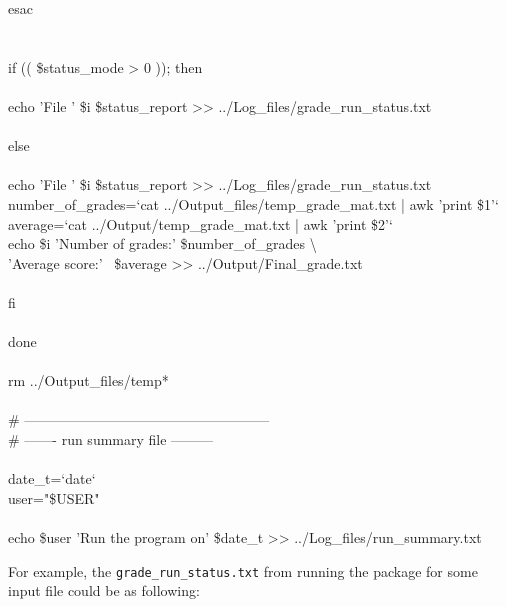 \begin{mdframed}[hidealllines=true,backgroundcolor=gray!20]
\begin{singlespace}
{{\color{for_pink}esac}\\
\\
\\
{\color{for_pink}if} (( \$status\_mode > 0 )); {\color{for_pink}then}\\
\\
echo {\color{red}'File '} \$i \$status\_report >>  ../Log\_files/grade\_run\_status.txt\\
\\
{\color{for_pink}else}\\
\\
echo {\color{red}'File '} \$i \$status\_report >>  ../Log\_files/grade\_run\_status.txt\\
number\_of\_grades={\color{red}`cat ../Output\_files/temp\_grade\_mat.txt | awk '{print \$1}'`}\\
average={\color{red}`cat ../Output/temp\_grade\_mat.txt | awk '{print \$2}'`}\\
echo \$i {\color{red}'Number of grades:'}  \$number\_of\_grades \textbackslash \\
\phantom{x}\hspace{14ex} {\color{red}'Average score:'} \  \$average >> ../Output/Final\_grade.txt \\
\\
{\color{for_pink}fi}\\
\\
{\color{for_pink}done}\\
\\
rm ../Output\_files/temp*  \\  
\\
{ \color{matlab_green} \# -----------------------------------------------------}\\
{ \color{matlab_green} \# ------- run summary file ---------}\\
\\
date\_t={\color{red}`date`}\\
user={\color{red}"\$USER"}\\
\\
echo  \$user {\color{red}'Run the program on'}  \$date\_t  >> ../Log\_files/run\_summary.txt\\
 }
\end{singlespace}
\end{mdframed}
\noindent
For example, the \texttt{grade\_run\_status.txt}  from running the package for some input file could be as following:\\

